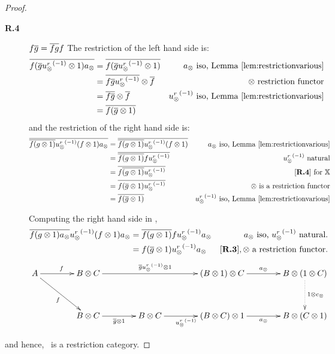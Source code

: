 \begin{proof}
\begin{description}
    \item[\textbf{R.4}] $f \overline{g} = \overline{f g} f$ The restriction of the left hand side is:
      \begin{align*}
        \overline{f (\overline{g} {u_{\otimes}^r}^{(-1)}\otimes 1) a_{\otimes}}
          & = \overline{f (\overline{g} {u_{\otimes}^r}^{(-1)}\otimes 1)} & a_{\otimes}
          \text{ iso, Lemma \ref{lem:restrictionvarious}} \\
        & = \overline{f \overline{g} {u_{\otimes}^r}^{(-1)}} \otimes \overline{f} & \otimes \text{ restriction functor}\\
        & = \overline{f \overline{g}} \otimes \overline{f} & {u_{\otimes}^r}^{(-1)}
          \text{ iso, Lemma \ref{lem:restrictionvarious}} \\
        & = \overline{f (\overline{g} \otimes 1)}
      \end{align*}
      and the restriction of the right hand side is:
      \begin{align*}
        \rst{\rst{f (g \* 1)} \inv{\usr} (f\* 1) a_{\*}}
          & = \rst{\rst{f (g \* 1)} \inv{\usr} (f\* 1) } & a_{\*}
          \text{ iso, Lemma \ref{lem:restrictionvarious}}\\
        & = \rst{\rst{f (g \* 1)} f \inv{\usr}  } & \inv{\usr} \text{ natural}\\
        & = \rst{f \rst{(g \* 1)}  \inv{\usr}  } & \text{ \rfour for }\X\\
        & = \rst{f (\rst{g} \* 1)  \inv{\usr}  } & \* \text{ is a restriction functor}\\
        & = \rst{f (\rst{g} \* 1)    } & \inv{\usr}
          \text{ iso, Lemma \ref{lem:restrictionvarious}}
      \end{align*}

      Computing the right hand side in \X,
      \begin{align*}
        \overline{f(g\otimes 1)a_{\otimes}} {u_{\otimes}^r}^{(-1)} (f\otimes 1) a_{\otimes}
          & = \overline{f(g\otimes 1)} f {u_{\otimes}^r}^{(-1)} a_{\otimes} & a_{\otimes} \text{ iso, } {\ensuremath{u_{\otimes}^r}}^{(-1)}\text{ natural.}\\
        & = f (\overline{g} \otimes 1) {u_{\otimes}^r}^{(-1)} a_{\otimes} & [\text{\bfseries {R}.{3}}], \otimes \text{ a restriction functor.}
      \end{align*}
      \[
        \xymatrix @C=40pt @R=35pt{
          A \ar[r]^f \ar[dr]_{f}
            & B\* C \ar[rr]^{\restr{g} \inv{\usr}\* 1}
            &
            & (B\* 1) \* C \ar[r]^{a_{\*}}
            & B \* (1 \* C)\ar@{.>}[d]^{1\*c_{\*}}\\
          & B\*C \ar[r]_{\rst{g}\*1}
            & B \* C \ar[r]_{\inv{\usr}}
            & (B \* C) \* 1 \ar[r]_{a_{\*}}
            & B \* (C\*1)
        }
      \]
  \end{description}

  and hence, \Xt\ is a restriction category.
\end{proof}
